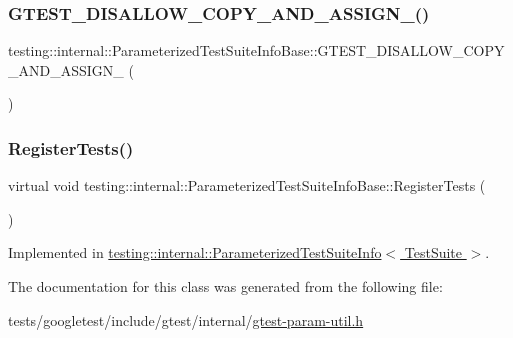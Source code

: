 \subsubsection{\texorpdfstring{G\+T\+E\+S\+T\+\_\+\+D\+I\+S\+A\+L\+L\+O\+W\+\_\+\+C\+O\+P\+Y\+\_\+\+A\+N\+D\+\_\+\+A\+S\+S\+I\+G\+N\+\_\+()}{GTEST\_DISALLOW\_COPY\_AND\_ASSIGN\_()}}
{\footnotesize\ttfamily testing\+::internal\+::\+Parameterized\+Test\+Suite\+Info\+Base\+::\+G\+T\+E\+S\+T\+\_\+\+D\+I\+S\+A\+L\+L\+O\+W\+\_\+\+C\+O\+P\+Y\+\_\+\+A\+N\+D\+\_\+\+A\+S\+S\+I\+G\+N\+\_\+ (\begin{DoxyParamCaption}\item[{\hyperlink{classtesting_1_1internal_1_1ParameterizedTestSuiteInfoBase}{Parameterized\+Test\+Suite\+Info\+Base}}]{ }\end{DoxyParamCaption})\hspace{0.3cm}{\ttfamily [private]}}

\mbox{\label{classtesting_1_1internal_1_1ParameterizedTestSuiteInfoBase_a41d7d663014af0c1e614c5a61293cb5a}} 
\subsubsection{\texorpdfstring{Register\+Tests()}{RegisterTests()}}
{\footnotesize\ttfamily virtual void testing\+::internal\+::\+Parameterized\+Test\+Suite\+Info\+Base\+::\+Register\+Tests (\begin{DoxyParamCaption}{ }\end{DoxyParamCaption})\hspace{0.3cm}{\ttfamily [pure virtual]}}



Implemented in \hyperlink{classtesting_1_1internal_1_1ParameterizedTestSuiteInfo_a8c0af866d3c291a63d3f4581ccd452d1}{testing\+::internal\+::\+Parameterized\+Test\+Suite\+Info$<$ Test\+Suite $>$}.



The documentation for this class was generated from the following file\+:\begin{DoxyCompactItemize}
\item 
tests/googletest/include/gtest/internal/\hyperlink{gtest-param-util_8h}{gtest-\/param-\/util.\+h}\end{DoxyCompactItemize}
